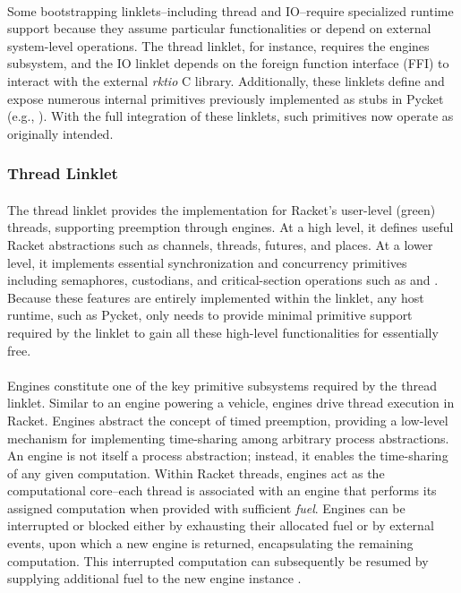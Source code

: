 			\paragraph{}%
				Some bootstrapping linklets--including thread and IO--require specialized runtime support because they assume particular functionalities or depend on external system-level operations. The thread linklet, for instance, requires the engines subsystem, and the IO linklet depends on the foreign function interface (FFI) to interact with the external \emph{rktio} C library. Additionally, these linklets define and expose numerous internal primitives previously implemented as stubs in Pycket (e.g., ). With the full integration of these linklets, such primitives now operate as originally intended.

			\subsubsection{Thread Linklet}

				\paragraph{}%
					The thread linklet provides the implementation for Racket's user-level (green) threads, supporting preemption through engines. At a high level, it defines useful Racket abstractions such as channels, threads, futures, and places. At a lower level, it implements essential synchronization and concurrency primitives including semaphores, custodians, and critical-section operations such as  and . Because these features are entirely implemented within the linklet, any host runtime, such as Pycket, only needs to provide minimal primitive support required by the linklet to gain all these high-level functionalities for essentially free.

				\paragraph{}%
					Engines constitute one of the key primitive subsystems required by the thread linklet. Similar to an engine powering a vehicle, engines drive thread execution in Racket. Engines abstract the concept of timed preemption, providing a low-level mechanism for implementing time-sharing among arbitrary process abstractions. An engine is not itself a process abstraction; instead, it enables the time-sharing of any given computation. Within Racket threads, engines act as the computational core--each thread is associated with an engine that performs its assigned computation when provided with sufficient \emph{fuel}. Engines can be interrupted or blocked either by exhausting their allocated fuel or by external events, upon which a new engine is returned, encapsulating the remaining computation. This interrupted computation can subsequently be resumed by supplying additional fuel to the new engine instance \cite{enginesOriginal}.

